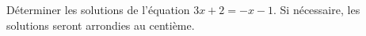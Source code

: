 \exercice

Déterminer les solutions de l'équation $3x+2=-x-1$. Si nécessaire, les solutions seront arrondies au centième.
